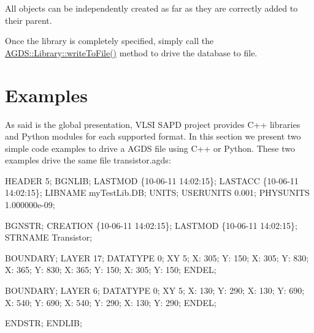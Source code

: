 All objects can be independently created as far as they are correctly added to their parent. \par
Once the library is completely specified, simply call the \hyperlink{class_a_g_d_s_1_1_library_a33b9d989b84857f46034085664ff3fa2}{A\-G\-D\-S\-::\-Library\-::write\-To\-File()} method to drive the database to file.\hypertarget{agds_agdsExamples}{}\section{Examples}\label{agds_agdsExamples}
As said is the global presentation, V\-L\-S\-I S\-A\-P\-D project provides C++ libraries and Python modules for each supported format. In this section we present two simple code examples to drive a A\-G\-D\-S file using C++ or Python. These two examples drive the same file {\ttfamily transistor.\-agds\-:} 
\begin{DoxyCodeInclude}
HEADER 5;
BGNLIB;
  LASTMOD \{10-06-11  14:02:15\};
  LASTACC \{10-06-11  14:02:15\};
LIBNAME myTestLib.DB;
UNITS;
  USERUNITS 0.001;
  PHYSUNITS 1.000000e-09;

BGNSTR;
  CREATION \{10-06-11  14:02:15\};
  LASTMOD  \{10-06-11  14:02:15\};
STRNAME Transistor;

BOUNDARY;
LAYER 17;
DATATYPE 0;
XY 5;
  X: 305;   Y: 150;
  X: 305;   Y: 830;
  X: 365;   Y: 830;
  X: 365;   Y: 150;
  X: 305;   Y: 150;
ENDEL;

BOUNDARY;
LAYER 6;
DATATYPE 0;
XY 5;
  X: 130;   Y: 290;
  X: 130;   Y: 690;
  X: 540;   Y: 690;
  X: 540;   Y: 290;
  X: 130;   Y: 290;
ENDEL;

ENDSTR;
ENDLIB;
\end{DoxyCodeInclude}


